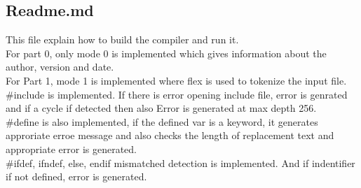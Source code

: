 \documentclass{article}
\begin{document}
\subsection*{Readme.md}
This file explain how to build the compiler and run it. \\
For part 0, only mode 0 is implemented which gives information about the author, version and date. \\
For Part 1,  mode 1 is implemented where flex is used to tokenize the input file. \\
$\#$include is implemented.
If there is error opening include file, error is genrated and if a cycle if detected then also Error is generated at max depth 256. \\

$\#$define is also implemented, if the defined var is a keyword, it generates approriate erroe message and also checks the length of replacement text and appropriate error is generated. \\

$\#$ifdef, ifndef, else, endif mismatched detection is implemented.
And if indentifier if not defined,  error is generated.
\end{document}

